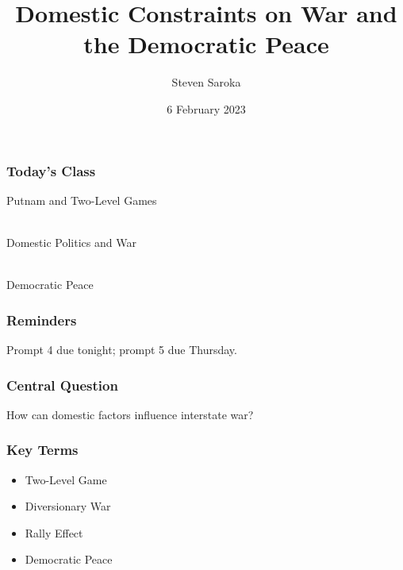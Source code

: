 \documentclass{beamer}
\title[Domestic Constraints and the Democratic Peace]{\LARGE{Domestic Constraints on War and the Democratic Peace}}
\author[POLI 150]{Steven Saroka}
\institute{POLI 150}
\date{6 February 2023}
\begin{document}
\begin{frame}
\titlepage %
\end{frame}



\begin{frame} 
	\frametitle{\LARGE{Today's Class}}
	\begin{itemize}
		\Large{
			\item Putnam and Two-Level Games
			\\~\\ 
			\item Domestic Politics and War
			\\~\\ 
			\item Democratic Peace
		}
	\end{itemize}
\end{frame}

\begin{frame} 
	\frametitle{\LARGE{Reminders}}
	\begin{itemize}
		\Large{
			\item Prompt 4 due tonight; prompt 5 due Thursday.
		}
	\end{itemize}
\end{frame}

\begin{frame} 
	\frametitle{\LARGE{Central Question}}
	\centering
	\Large{How can domestic factors influence interstate war?}
\end{frame}

\begin{frame} 
	\frametitle{\LARGE{Key Terms}}
	\begin{itemize}
		\item Two-Level Game 
		\item Diversionary War
		\item Rally Effect
		\item Democratic Peace
	\end{itemize}
\end{frame}

\end{document}
